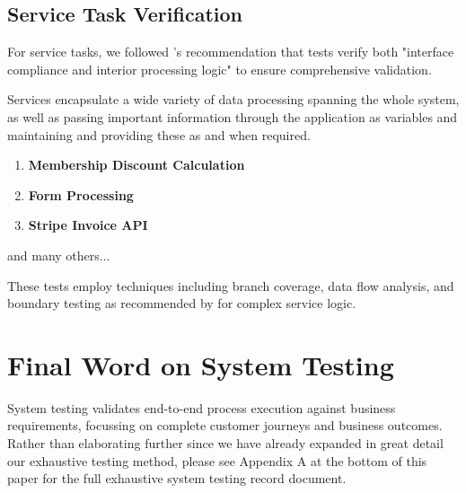 \documentclass[14pt,a4paper]{article}
\begin{document}
\subsection{Service Task Verification}

For service tasks, we followed \textit{\parencite[p. 53]{Garcia-Borgonon2017}}'s recommendation that tests verify both "interface compliance and interior processing logic" to ensure comprehensive validation.

Services encapsulate a wide variety of data processing spanning the whole system, as well as passing important information through the application as variables and maintaining and providing these as and when required.

\begin{enumerate}
    \item \textbf{Membership Discount Calculation}
    \item \textbf{Form Processing}
    \item \textbf{Stripe Invoice API}
\end{enumerate}

and many others...
\vspace{1em}

These tests employ techniques including branch coverage, data flow analysis, and boundary testing as recommended by \textit{\parencite[p. 168]{Weber2016}} for complex service logic.

\section{Final Word on System Testing}

System testing validates end-to-end process execution against business requirements, focussing on complete customer journeys and business outcomes. Rather than elaborating further since we have already expanded in great detail our exhaustive testing method, please see Appendix A at the bottom of this paper for the full exhaustive system testing record document.

\printbibliography


\end{document}
